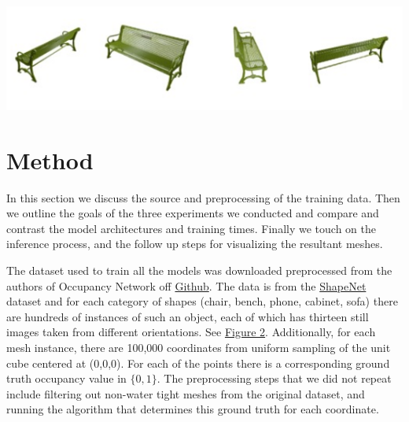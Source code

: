 \documentclass[11pt]{article}
\begin{document}
\begin{multicols}{2}
{    \includegraphics[scale=0.6]{sampleTrainingBench/benches.png}

    \section{Method}
    In this section we discuss the source and preprocessing of the training data. Then we outline the goals of the three experiments we conducted and compare and contrast the model architectures and training times. Finally we touch on the inference process, and the follow up steps for visualizing the resultant meshes.

    The dataset used to train all the models was downloaded preprocessed from the authors of Occupancy Network off \hyperlink{ref3}{Github}. The data is from the \hyperlink{ref2}{ShapeNet} dataset and for each category of shapes (chair, bench, phone, cabinet, sofa) there are hundreds of instances of such an object, each of which has thirteen still images taken from different orientations. See \hyperlink{fig2}{Figure 2}. Additionally, for each mesh instance, there are 100,000 coordinates from uniform sampling of the unit cube centered at (0,0,0). For each of the points there is a corresponding ground truth occupancy value in $\{0,1\}$. The preprocessing steps that we did not repeat include filtering out non-water tight meshes from the original dataset, and running the algorithm that determines this ground truth for each coordinate. \\


}
\end{multicols}
\end{document}

